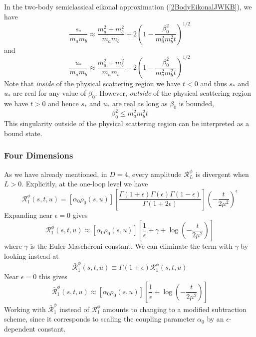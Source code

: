 In the two-body semiclassical eikonal approximation (\ref{2BodyEikonalJWKB}), we have
\begin{equation}
	\frac{s_{*}}{m_{a} m_{b}} \approx \frac{m_{a}^{2} + m_{b}^{2}}{m_{a} m_{b}} + 2 \left( 1 - \frac{\beta_{0}^{2}}{m_{a}^{2} m_{b}^{2} t} \right)^{1/2}
\end{equation}
and
\begin{equation}
	\frac{u_{*}}{m_{a} m_{b}} \approx \frac{m_{a}^{2} + m_{b}^{2}}{m_{a} m_{b}} - 2 \left( 1 - \frac{\beta_{0}^{2}}{m_{a}^{2} m_{b}^{2} t} \right)^{1/2}
\end{equation}
Note that \textit{inside} of the physical scattering region we have $t < 0$ and thus $s_{*}$ and $u_{*}$ are real for any value of $\beta_{0}$. However, \textit{outside} of the physical scattering region we have $t > 0$ and hence $s_{*}$ and $u_{*}$ are real as long as $\beta_{0}$ is bounded,
\begin{equation}
	\beta_{0}^{2} \leq m_{a}^{2} m_{b}^{2} t
\end{equation}
This singularity outside of the physical scattering region can be interpreted as a bound state.
\subsubsection{Four Dimensions}
As we have already mentioned, in $D = 4$, every amplitude $\mathcal{R}_{L}^{\phi}$ is divergent when $L > 0$. Explicitly, at the one-loop level we have
\begin{equation}
	\mathcal{R}_{1}^{\phi}(s, t, u) = \left[ \alpha_{0} \rho_{0}(s, u) \right] \left[ \frac{\Gamma(1 + \epsilon) \Gamma(\epsilon) \Gamma(1 - \epsilon)}{\Gamma(1 + 2 \epsilon)} \right] \left( -\frac{t}{2 \mu^{2}} \right)^{\epsilon}
\end{equation}
Expanding near $\epsilon = 0$ gives
\begin{equation}
	\mathcal{R}_{1}^{\phi}(s, t, u) \approx \left[ \alpha_{0} \rho_{0}(s, u) \right] \left[ \frac{1}{\epsilon} + \gamma + \log{\left( -\frac{t}{2 \mu^{2}} \right)} \right] \label{1Loop4D}
\end{equation}
where $\gamma$ is the Euler-Mascheroni constant. We can eliminate the term with $\gamma$ by looking instead at
\begin{equation}
	\bar{\mathcal{R}}_{1}^{\phi}(s, t, u) \equiv \Gamma(1 + \epsilon) \mathcal{R}_{1}^{\phi}(s, t, u)
\end{equation}
Near $\epsilon = 0$ this gives
\begin{equation}
	\bar{\mathcal{R}}_{1}^{\phi}(s, t, u) \approx \left[ \alpha_{0} \rho_{0}(s, u) \right] \left[ \frac{1}{\epsilon} + \log{\left( -\frac{t}{2 \mu^{2}} \right)} \right]
\end{equation}
Working with $\bar{\mathcal{R}}_{1}^{\phi}$ instead of $\mathcal{R}_{1}^{\phi}$ amounts to changing to a modified subtraction scheme, since it corresponds to scaling the coupling parameter $\alpha_{0}$ by an $\epsilon$-dependent constant.

